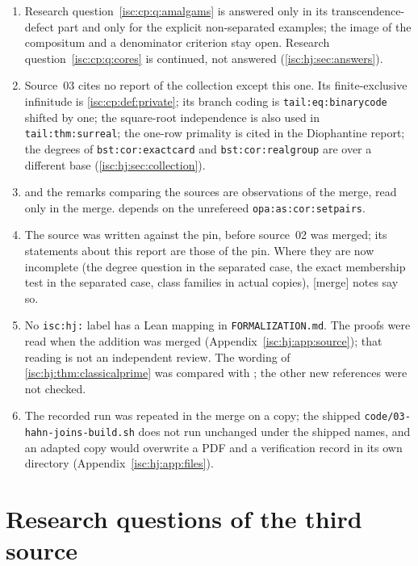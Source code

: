 \documentclass[11pt,letterpaper]{article}
\theoremstyle{definition}
\theoremstyle{remark}
\newcommand{\rpath}[1]{\nolinkurl{#1}}%
\newcommand{\lbl}[1]{\nolinkurl{#1}}%
\newcommand{\mtag}{\textup{[merge]}}%
\numberwithin{equation}{section}
\begin{document}
\begin{enumerate}[label=JM\arabic*.,leftmargin=2.8em,itemsep=2pt]
\item Research question~\ref{isc:cp:q:amalgams} is answered only in its
transcendence-defect part and only for the explicit non-separated examples;
the image of the compositum and a denominator criterion stay open. Research
question~\ref{isc:cp:q:cores} is continued, not answered
(\cref{isc:hj:sec:answers}).
\item Source~03 cites no report of the collection except this one. Its
finite-exclusive infinitude is \cref{isc:cp:def:private}; its branch coding
is \lbl{tail:eq:binarycode} shifted by one; the square-root independence is
also used in \lbl{tail:thm:surreal}; the one-row primality is cited in the
Diophantine report; the degrees of \lbl{bst:cor:exactcard} and
\lbl{bst:cor:realgroup} are over a different base
(\cref{isc:hj:sec:collection}).
\item {} and the remarks
comparing the sources are observations of the merge, read only in the
merge.  depends on the unrefereed
\lbl{opa:as:cor:setpairs}.
\item The source was written against the pin, before source~02 was merged;
its statements about this report are those of the pin. Where they are now
incomplete (the degree question in the separated case, the exact
membership test in the separated case, class families in actual copies),
\mtag{} notes say so.
\item No \texttt{isc:hj:} label has a Lean mapping in
\rpath{FORMALIZATION.md}. The proofs were read when the addition was
merged (Appendix~\ref{isc:hj:app:source}); that reading is not an
independent review. The wording of \cref{isc:hj:thm:classicalprime} was
compared with \cite[Section~1.3]{LM}; the other new references were not
checked.
\item The recorded run was repeated in the merge on a copy; the shipped
\rpath{code/03-hahn-joins-build.sh} does not run unchanged under the
shipped names, and an adapted copy would overwrite a PDF and a
verification record in its own directory (Appendix~\ref{isc:hj:app:files}).
\end{enumerate}

\section{Research questions of the third source}\label{isc:hj:sec:questions}
\end{document}

